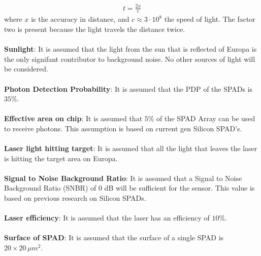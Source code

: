 \begin{align}\label{eq:accuracy}
t = \frac{2x}{c}
\end{align}
where $x$ is the accuracy in distance, and $c\approx 3\cdot10^8$ the speed of light. The factor two is present because the light travels the distance twice.\\
\\
\textbf{Sunlight}: It is assumed that the light from the sun that is reflected of Europa is the only signifant contributor to background noise. No other sources of light will be considered. \\
\\
\textbf{Photon Detection Probability}: It is assumed that the PDP of the SPADs is $35\%$.\\
\\
\textbf{Effective area on chip}: It is assumed that $5\%$ of the SPAD Array can be used to receive photons. This assumption is based on current gen Silicon SPAD's.
\\
\\
\textbf{Laser light hitting target}: It is assumed that all the light that leaves the laser is hitting the target area on Europa.
\\
\\
\textbf{Signal to Noise Background Ratio}: It is assumed that a Signal to Noise Background Ratio (SNBR) of 0 dB will be sufficient for the sensor. This value is based on previous research on Silicon SPADs.\\
\\
\textbf{Laser efficiency}: It is assumed that the laser has an efficiency of $10\%$.\\
\\
\textbf{Surface of SPAD}: It is assumed that the surface of a single SPAD is $20\times 20 \,\mu m^2$.
